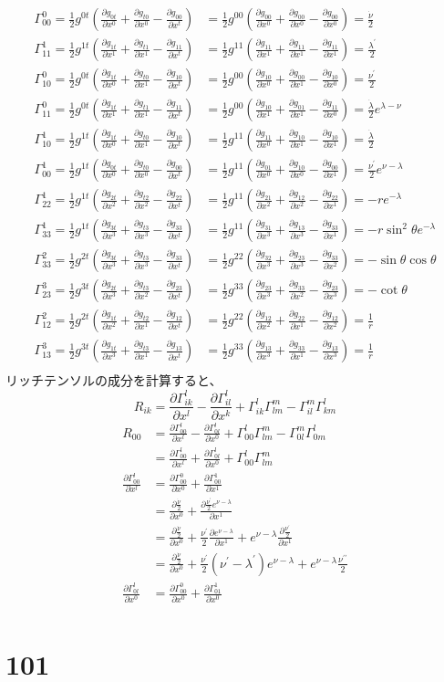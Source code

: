 \documentclass{jsarticle}
\newcommand{\pder}[2][]{\frac{\partial#1}{\partial#2}}
\newcommand{\pderx}[2][]{\pder[#1]{x^{#2}}}
\newcommand{\pdergx}[2][]{\pderx[g_{#1}]{#2}}
\newcommand{\half}{\frac{1}{2}}
\newcommand{\beq}{\begin{equation}}
\newcommand{\eeq}{\end{equation}}
\newcommand{\GaT}[3]{\Gamma^{#1}_{#2 #3}}
\newcommand{\pderGaTx}[4]{\pderx[\GaT{#1}{#2}{#3}]{#4}}
\newcommand{\Christfinside}[3]{\pdergx[#1 #3]{#2} + \pdergx[#3 #2]{#1} - \pdergx[#1 #2]{#3}}
\newcommand{\Christf}[4]{\Gamma^{#1}_{#2 #3}=\half g^{#1 #4}(\Christfinside{#2}{#3}{#4})}
\newcommand{\Ricchiinside}[2]{\pder[\Gamma^l_{#1 #2}]{x^l} - \pder[\Gamma^l_{#1 l}]{x^{#2}} 
+ \GaT{l}{#1}{#2}\GaT{m}{l}{m} - \GaT{m}{#1}{l}\GaT{l}{#2}{m}}
\begin{document}
\begin{align}
    \Christf{0}{0}{0}{t} &=  \half g^{00} (\Christfinside{0}{0}{0}) = \frac{\dot{\nu}}{2}\\
    \Christf{1}{1}{1}{t} &=  \half g^{11} (\Christfinside{1}{1}{1}) = \frac{\lambda^\prime}{2}\\
    \Christf{0}{1}{0}{t} &=  \half g^{00} (\Christfinside{1}{0}{0}) = \frac{\nu^\prime}{2}\\
    \Christf{0}{1}{1}{t} &=  \half g^{00} (\Christfinside{1}{1}{0}) = \frac{\dot{\lambda}}{2}e^{\lambda - \nu}\\
    \Christf{1}{1}{0}{t} &=  \half g^{11} (\Christfinside{1}{0}{1}) = \frac{\dot{\lambda}}{2}\\
    \Christf{1}{0}{0}{t} &=  \half g^{11} (\Christfinside{0}{0}{1}) = \frac{\nu^\prime }{2}e^{\nu - \lambda}\\
    \Christf{1}{2}{2}{t} &=  \half g^{11} (\Christfinside{2}{2}{1}) = -re^{-\lambda}\\
    \Christf{1}{3}{3}{t} &=  \half g^{11} (\Christfinside{3}{3}{1}) = -r\sin^2 \theta e^{-\lambda}\\
    \Christf{2}{3}{3}{t} &=  \half g^{22} (\Christfinside{3}{3}{2}) = -\sin\theta \cos\theta\\
    \Christf{3}{2}{3}{t} &=  \half g^{33} (\Christfinside{2}{3}{3}) = -\cot\theta\\
    \Christf{2}{1}{2}{t} &=  \half g^{22} (\Christfinside{1}{2}{2}) = \frac{1}{r}\\
    \Christf{3}{1}{3}{t} &=  \half g^{33} (\Christfinside{1}{3}{3}) = \frac{1}{r}\\
\end{align}
リッチテンソルの成分を計算すると、
\beq
    R_{ik} =  \pder[\Gamma^l_{ik}]{x^l} - \pder[\Gamma^l_{il}]{x^k}
    + \GaT{l}{i}{k}\GaT{m}{l}{m} - \GaT{m}{i}{l}\GaT{l}{k}{m}
\eeq
\begin{align}
    R_{00} &= \Ricchiinside{0}{0}\\
           &= \pderGaTx{l}{0}{0}{l} + \pderGaTx{l}{0}{l}{0} + \GaT{l}{0}{0}\GaT{m}{l}{m}\\
    \pderGaTx{l}{0}{0}{l} &= \pderGaTx{0}{0}{0}{0} + \pderGaTx{1}{0}{0}{1}\\
                          &= \pderx[\frac{\dot{\nu}}{2}]{0} + \pderx[\frac{\nu^\prime }{2}e^{\nu - \lambda}]{1} \\
                          &= \pderx[\frac{\dot{\nu}}{2}]{0} + \frac{\nu^\prime }{2}\pderx[e^{\nu - \lambda}]{1} + e^{\nu - \lambda}\pderx[\frac{\nu^\prime }{2}]{1}\\ 
                          &= \pderx[\frac{\dot{\nu}}{2}]{0} + \frac{\nu^\prime }{2}(\nu^\prime - \lambda^\prime)e^{\nu - \lambda}
                          + e^{\nu - \lambda}\frac{\nu^{\prime \prime}}{2}\\ 
    \pderGaTx{l}{0}{l}{0} &= \pderGaTx{0}{0}{0}{0} + \pderGaTx{1}{0}{1}{0}\\
\end{align}
\section{101}
\end{document}
